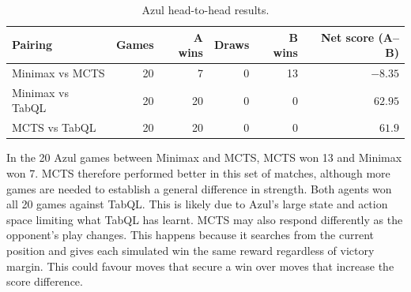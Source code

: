 \begin{table}[H]
    \centering
    \begin{tabular}{lrrrrr}
        \hline
        Pairing & Games & A wins & Draws & B wins & Net score (A--B) \\
        \hline
        Minimax vs MCTS  & 20 & 7  & 0 & 13 & $-8.35$ \\
        Minimax vs TabQL & 20 & 20 & 0 & 0  & $62.95$ \\
        MCTS vs TabQL    & 20 & 20 & 0 & 0  & $61.9$ \\
        \hline
    \end{tabular}
    \caption{Azul head-to-head results.}
    \label{tab:azul-results}
\end{table}

In the 20 Azul games between Minimax and MCTS, MCTS won 13 and Minimax won 7. MCTS therefore performed better in this set of matches, although more games are needed to establish a general difference in strength. Both agents won all 20 games against TabQL. This is likely due to Azul’s large state and action space limiting what TabQL has learnt. MCTS may also respond differently as the opponent’s play changes. This happens because it searches from the current position and gives each simulated win the same reward regardless of victory margin. This could favour moves that secure a win over moves that increase the score difference. 
